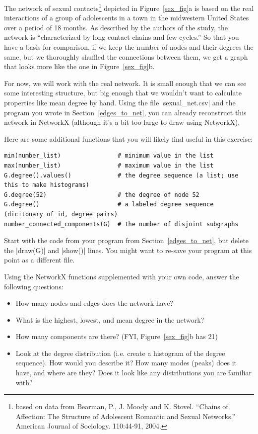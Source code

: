 \documentclass{article}
\begin{document}
The network of sexual contacts\footnote{based on data from Bearman, P., J. Moody and K. Stovel. ``Chains of Affection: The 
Structure of Adolescent Romantic and Sexual Networks.'' American Journal of Sociology. 110:44-91, 2004.} depicted in Figure~\ref{sex_fig}a is based on the real interactions of a 
group of adolescents in a town in the midwestern United States over a period of 18 months.  As described by the authors of the study, the network is
``characterized by long contact chains and few cycles.''  So that you have a basis for comparison, if we keep the number of nodes and their degrees the same,
but we thoroughly shuffled the connections between them, we get a graph that looks more like the one in Figure~\ref{sex_fig}b.

For now, we will work with the real network.  It is small enough that we can see some 
interesting structure, but big enough that we wouldn't want to calculate properties like mean degree by hand. 
 Using the file |sexual_net.csv| and the program you wrote in Section~\ref{edges_to_net}, you can already reconstruct this network 
in NetworkX (although it's a bit too large to draw using NetworkX).

Here are some additional functions that you will likely find useful in this exercise:
\begin{Verbatim}[samepage=true]
min(number_list)                # minimum value in the list
max(number_list)                # maximum value in the list
G.degree().values()             # the degree sequence (a list; use this to make histograms)
G.degree(52)                    # the degree of node 52
G.degree()                      # a labeled degree sequence (dicitonary of id, degree pairs)
number_connected_components(G)  # the number of disjoint subgraphs
\end{Verbatim}

Start with the code from your program from Section~\ref{edges_to_net}, but delete the |draw(G)| and |show()| lines.  You might want to re-save your 
program at this point as a different file.

Using the NetworkX functions supplemented with your own code, answer the following questions:
\begin{itemize}
 \item How many nodes and edges does the network have?
 \item What is the highest, lowest, and mean degree in the network?
 \item How many components are there?  (FYI, Figure~\ref{sex_fig}b has 21)
 \item Look at the degree distribution (i.e. create a histogram of the degree sequence).  How would you describe it?  How many modes (peaks) 
does it have, and where are they?  Does it look like any distributions you are familiar with?
\end{itemize}
\end{document}
